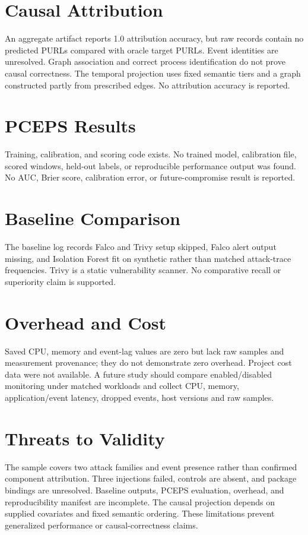 \documentclass[12pt,a4paper,oneside]{report}
\begin{document}
\section{Causal Attribution}
An aggregate artifact reports 1.0 attribution accuracy, but raw records contain no predicted PURLs compared with oracle target PURLs. Event identities are unresolved. Graph association and correct process identification do not prove causal correctness. The temporal projection uses fixed semantic tiers and a graph constructed partly from prescribed edges. No attribution accuracy is reported.
\section{PCEPS Results}
Training, calibration, and scoring code exists. No trained model, calibration file, scored windows, held-out labels, or reproducible performance output was found. No AUC, Brier score, calibration error, or future-compromise result is reported.
\section{Baseline Comparison}
The baseline log records Falco and Trivy setup skipped, Falco alert output missing, and Isolation Forest fit on synthetic rather than matched attack-trace frequencies. Trivy is a static vulnerability scanner. No comparative recall or superiority claim is supported.
\section{Overhead and Cost}
Saved CPU, memory and event-lag values are zero but lack raw samples and measurement provenance; they do not demonstrate zero overhead. Project cost data were not available. A future study should compare enabled/disabled monitoring under matched workloads and collect CPU, memory, application/event latency, dropped events, host versions and raw samples.
\section{Threats to Validity}
The sample covers two attack families and event presence rather than confirmed component attribution. Three injections failed, controls are absent, and package bindings are unresolved. Baseline outputs, PCEPS evaluation, overhead, and reproducibility manifest are incomplete. The causal projection depends on supplied covariates and fixed semantic ordering. These limitations prevent generalized performance or causal-correctness claims.
\end{document}
